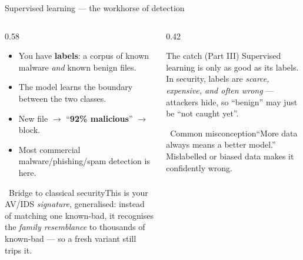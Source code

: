 \documentclass[aspectratio=169,10pt]{beamer}
\newcommand{\term}[1]{{\color{mlink}\textbf{#1}}}         %
\newcommand{\bridge}[1]{%
  \begin{block}{\small\ding{43}\ Bridge to classical security}\small #1\end{block}}
\newcommand{\myth}[1]{%
  \begin{alertblock}{\small\ding{55}\ Common misconception}\small #1\end{alertblock}}
\begin{document}
\begin{frame}{Supervised learning --- the workhorse of detection}
  \begin{columns}[T]
    \begin{column}{0.58\textwidth}
      \begin{itemize}
        \item You have \term{labels}: a corpus of known malware \emph{and} known
              benign files.
        \item The model learns the boundary between the two classes.
        \item New file $\to$ ``\textbf{92\% malicious}'' $\to$ block.
        \item Most commercial malware/phishing/spam detection is here.
      \end{itemize}
      \bridge{This is your AV/IDS \emph{signature}, generalised: instead of
      matching one known-bad, it recognises the \emph{family resemblance} to
      thousands of known-bad --- so a fresh variant still trips it.}
    \end{column}
    \begin{column}{0.42\textwidth}
      \begin{block}{\small The catch (Part III)}
        \small Supervised learning is only as good as its labels. In security,
        labels are \emph{scarce, expensive, and often wrong} --- attackers hide,
        so ``benign'' may just be ``not caught yet''.
      \end{block}
      \myth{``More data always means a better model.'' Mislabelled or biased data
      makes it confidently wrong.}
    \end{column}
  \end{columns}
\end{frame}
\end{document}
